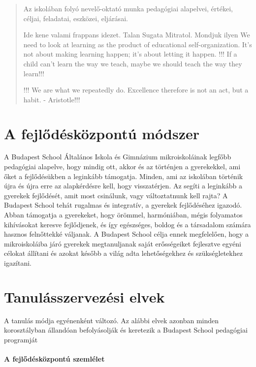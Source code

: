 \begin{quote}
      Az iskolában folyó nevelő-oktató munka pedagógiai alapelvei, értékei,
      céljai,
      feladatai, eszközei, eljárásai.

      Ide kene valami frappans idezet. Talan Sugata Mitratol. Mondjuk ilyen We
      need
      to look at learning as the product of educational self-organization. It’s
      not
      about making learning happen; it’s about letting it happen.
      !!! If a child can't learn the way we teach, maybe we should teach the
      way
      they learn!!!

      !!! We are what we repeatedly do. Excellence therefore is not an act, but
      a
      habit. - Aristotle!!!

\end{quote}


\section{A fejlődésközpontú módszer}
A Budapest School Általános Iskola és Gimnázium mikroiskoláinak legfőbb
pedagógiai alapelve, hogy mindig ott, akkor és az történjen a
gyerekekkel, ami őket a fejlődésükben a leginkább támogatja. Minden, ami
az iskolában történik újra és újra erre az alapkérdésre kell, hogy
visszatérjen. Az segíti a leginkább a gyerekek fejlődését, amit most
csinálunk, vagy változtatnunk kell rajta? A Budapest School
tehát rugalmas és integratív, a gyerekek fejlődéséhez igazodó. Abban
támogatja a gyerekeket, hogy örömmel, harmóniában, mégis folyamatos
kihívásokat keresve fejlődjenek, és így egészséges, boldog és a
társadalom számára hasznos felnőttekké váljanak. A Budapest School
célja ennek megfelelően, hogy a mikroiskoláiba járó gyerekek
megtanuljanak saját erősségeiket fejlesztve egyéni célokat állítani és
azokat később a  világ adta lehetőségekhez és szükségletekhez
igazítani.

\section{Tanulásszervezési elvek}
\label{sec:tanulasszervezesi_elvek}
A tanulás módja egyénenként változó. Az alábbi elvek azonban minden
korosztályban állandóan befolyásolják és keretezik a Budapest School
pedagógiai programját

\paragraph{A fejlődésközpontú szemlélet}


